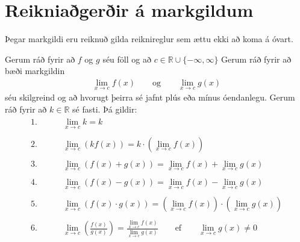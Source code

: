 \documentclass[a4paper,10pt,icelandic]{sphinxmanual}
\begin{document}
\section{Reikniaðgerðir á markgildum}
\label{\detokenize{Kafli10:reikniagerir-a-markgildum}}
Þegar  markgildi eru reiknuð gilda reiknireglur sem ættu ekki að koma á óvart.

Gerum ráð fyrir að \(f\) og \(g\) séu föll og að \(c\in \mathbb{R} \cup\{-\infty,\infty\}\)
Gerum ráð fyrir að bæði markgildin
\begin{equation*}
\begin{split}\lim_{x\to c}f(x)\qquad \text{og}\qquad \lim_{x\to c}g(x)\end{split}
\end{equation*}
séu skilgreind og að hvorugt þeirra sé jafnt plús eða mínus óendanlegu.
Gerum ráð fyrir að \(k\in\mathbb{R}\) sé fasti.
Þá gildir:
\begin{equation*}
\begin{split}\begin{aligned}
1. & \qquad \lim_{x\to c}k=k \\
\quad\\
2. & \qquad \lim_{x\to c} \left(kf(x) \right)=k \cdot \left(\lim_{x\to c}f(x)\right) \\
\quad\\
3. & \qquad \lim_{x\to c} \left(f(x)+g(x)\right)=\lim_{x\to c}f(x)+\lim_{x\to c}g(x) \\
\quad\\
4. & \qquad \lim_{x\to c} \left(f(x)-g(x)\right)=\lim_{x\to c}f(x)-\lim_{x\to c}g(x) \\
\quad\\
5. & \qquad \lim_{x\to c} \left(f(x)\cdot g(x)\right)= \left( \lim_{x\to c}f(x) \right)\cdot \left(\lim_{x\to c}g(x) \right) \\
\quad\\
6. & \qquad \lim_{x\to c} \left( \frac{f(x)}{g(x)} \right)=\frac{\lim_{x\to c}f(x)}{\lim_{x\to c}g(x)} \qquad \text{ef} \qquad \lim_{x\to c}g(x)\not=0
\end{aligned}\end{split}
\end{equation*}
\end{document}
